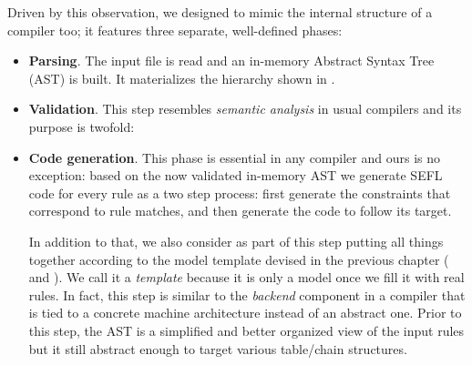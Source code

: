 Driven by this observation, we designed \TOOL to mimic the internal
structure of a compiler too; it features three separate, well-defined phases:
\begin{itemize}
  \item \textbf{Parsing}. The input file is read and an in-memory Abstract
    Syntax Tree (AST) is built.  It
    materializes the hierarchy shown in
    .
  \item \textbf{Validation}.  This step resembles \emph{semantic analysis} in
    usual compilers and its purpose is twofold:
  \item \textbf{Code generation}. This phase is essential in any compiler and
    ours is no exception: based on the now validated in-memory AST we generate
    SEFL code for every rule as a two step process: first generate the
    constraints that correspond to rule matches, and then generate the code to
    follow its target.

    In addition to that, we also consider as part of this step putting all
    things together according to the model template devised in the previous
    chapter ( and
    ).  We call it a \emph{template}
    because it is only a model once we fill it with real rules.  In fact, this
    step is similar to the \emph{backend} component in a compiler that is tied
    to a concrete machine architecture instead of an abstract one.  Prior to
    this step, the AST is a simplified and better organized view of the input
    rules but it still abstract enough to target various table/chain
    structures.
\end{itemize}

